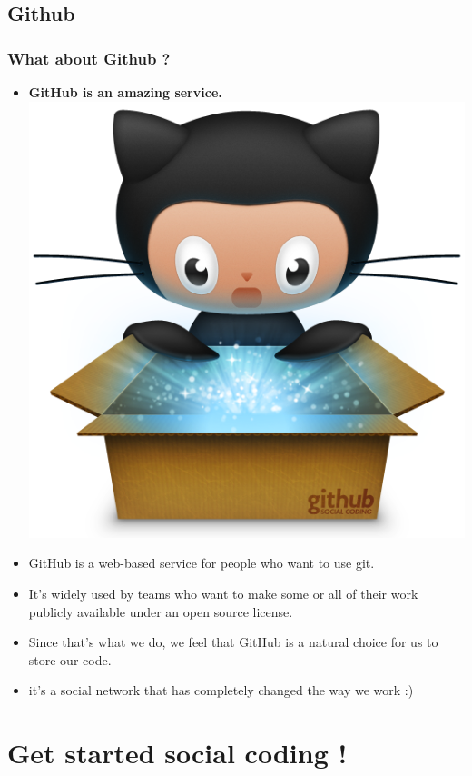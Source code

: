 \documentclass{beamer}
\begin{document}
\subsection{Github}
\begin{frame}
\frametitle{What about Github ?}
\begin{itemize}
\item \textbf{GitHub is an amazing service.}
  \includegraphics[scale=0.1]{github_client.png}
\item GitHub is a web-based service for people who want to use git.
\item It’s widely used by teams who want to make some or all of their work publicly available under an open source license.
\item Since that’s what we do, we feel that GitHub is a natural choice for us to store our code.
\item it's a social network that has completely changed the way we work :)
\end{itemize}
\end{frame}




\section{Get started social coding !}
\end{document}
